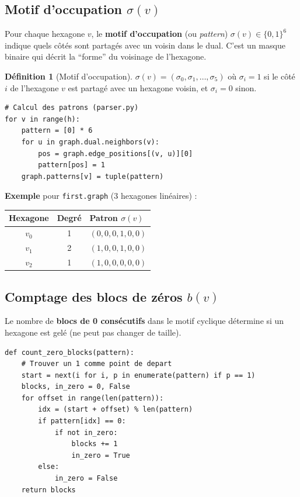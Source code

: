 \documentclass[12pt,a4paper]{article}
\theoremstyle{definition}
\newtheorem{definition}{Définition}[section]
\begin{document}
\subsection{Motif d'occupation $\sigma(v)$}

Pour chaque hexagone $v$, le \textbf{motif d'occupation} (ou \textit{pattern})
$\sigma(v) \in \{0, 1\}^6$ indique quels côtés sont partagés avec un voisin dans le dual.
C'est un masque binaire qui décrit la ``forme'' du voisinage de l'hexagone.

\begin{definition}[Motif d'occupation]
  $\sigma(v) = (\sigma_0, \sigma_1, \ldots, \sigma_5)$ où $\sigma_i = 1$ si le côté $i$
  de l'hexagone $v$ est partagé avec un hexagone voisin, et $\sigma_i = 0$ sinon.
\end{definition}

\begin{lstlisting}
# Calcul des patrons (parser.py)
for v in range(h):
    pattern = [0] * 6
    for u in graph.dual.neighbors(v):
        pos = graph.edge_positions[(v, u)][0]
        pattern[pos] = 1
    graph.patterns[v] = tuple(pattern)
\end{lstlisting}

\textbf{Exemple} pour \texttt{first.graph} (3 hexagones linéaires) :
\begin{center}
\begin{tabular}{ccl}
  \toprule
  Hexagone & Degré & Patron $\sigma(v)$ \\
  \midrule
  $v_0$ & 1 & $(0, 0, 0, 1, 0, 0)$ \\
  $v_1$ & 2 & $(1, 0, 0, 1, 0, 0)$ \\
  $v_2$ & 1 & $(1, 0, 0, 0, 0, 0)$ \\
  \bottomrule
\end{tabular}
\end{center}

\subsection{Comptage des blocs de zéros $b(v)$}

Le nombre de \textbf{blocs de 0 consécutifs} dans le motif cyclique détermine si un hexagone
est gelé (ne peut pas changer de taille).

\begin{lstlisting}
def count_zero_blocks(pattern):
    # Trouver un 1 comme point de depart
    start = next(i for i, p in enumerate(pattern) if p == 1)
    blocks, in_zero = 0, False
    for offset in range(len(pattern)):
        idx = (start + offset) % len(pattern)
        if pattern[idx] == 0:
            if not in_zero:
                blocks += 1
                in_zero = True
        else:
            in_zero = False
    return blocks
\end{lstlisting}
\end{document}
